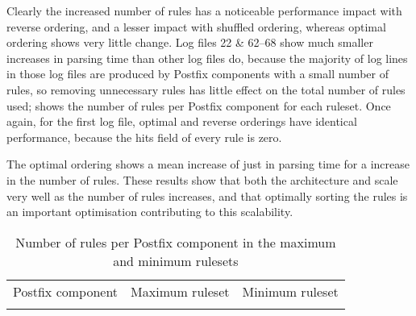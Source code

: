Clearly the increased number of rules has a noticeable performance impact
with reverse ordering, and a lesser impact with shuffled ordering, whereas
optimal ordering shows very little change.  Log files 22 \& 62--68 show
much smaller increases in parsing time than other log files do, because the
majority of log lines in those log files are produced by Postfix components
with a small number of rules, so removing unnecessary rules has little
effect on the total number of rules used;  shows the number of
rules per Postfix component for each ruleset.  Once again, for the first
log file, optimal and reverse orderings have identical performance, because
the hits field of every rule is zero.

The optimal ordering shows a mean increase of just
 in parsing time
for a \numberOFrulesMAXIMUMpercentage{} increase in the number of rules.
These results show that both the architecture and \parsername{} scale very
well as the number of rules increases, and that optimally sorting the rules
is an important optimisation contributing to this scalability.



\begin{table}[thbp]
    \caption{Number of rules per Postfix component in the maximum and
    minimum rulesets}
    \empty{}\label{Number of rules per Postfix component in the maximum and
    minimum rulesets}
    \centering{}
    \begin{tabular}{lrr}
        \tabletopline{}%
        Postfix component & Maximum ruleset & Minimum ruleset \\
        \tablemiddleline{}%
        
        \tablebottomline{}%
    \end{tabular}
\end{table}

